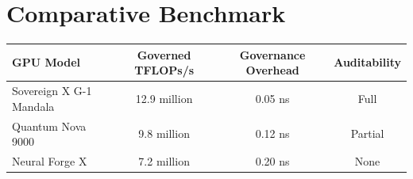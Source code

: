 \documentclass[10pt,a4paper]{article}
\begin{document}
\section{Comparative Benchmark}

\begin{center}
\begin{tabular}{lccc}
\toprule
GPU Model & Governed TFLOPs/s & Governance Overhead & Auditability \\
\midrule
Sovereign X G-1 Mandala & 12.9 million & 0.05 ns & Full \\
Quantum Nova 9000 & 9.8 million & 0.12 ns & Partial \\
Neural Forge X & 7.2 million & 0.20 ns & None \\
\bottomrule
\end{tabular}
\end{center}
\end{document}
